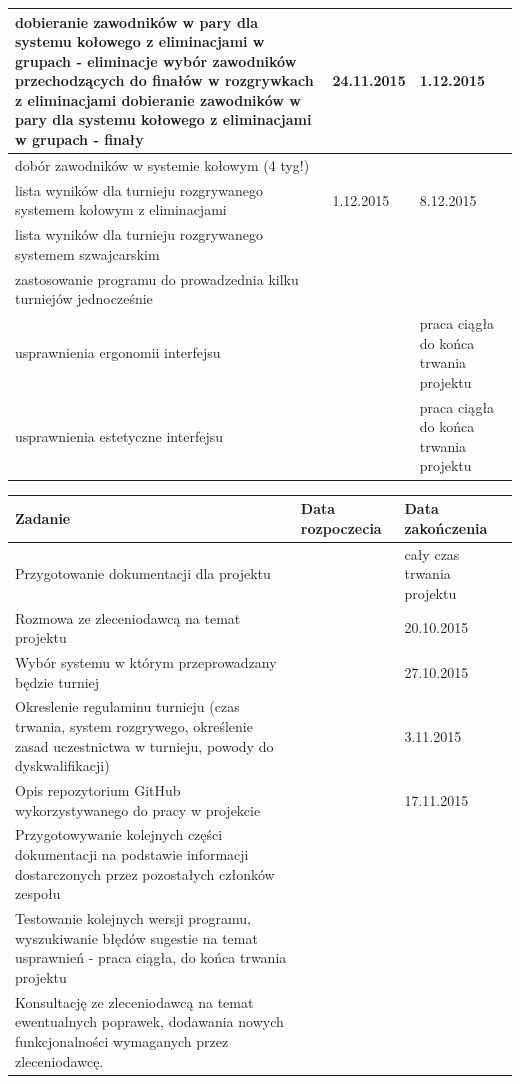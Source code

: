 \begin{tabular}{|p{9cm}|l|p{3cm}|}
dobieranie zawodników w pary dla systemu kołowego z eliminacjami w grupach - eliminacje
wybór zawodników przechodzących do finałów w rozgrywkach z eliminacjami
dobieranie zawodników w pary dla systemu kołowego z eliminacjami w grupach - finały&24.11.2015&1.12.2015\\ \hline
dobór zawodników w systemie kołowym (4 tyg!)&&\\ \hline 
lista wyników dla turnieju rozgrywanego systemem kołowym z eliminacjami&1.12.2015&8.12.2015\\ \hline
lista wyników dla turnieju rozgrywanego systemem szwajcarskim&&\\ \hline 
zastosowanie programu do prowadzednia kilku turniejów jednocześnie&&\\ \hline
usprawnienia ergonomii interfejsu&&praca ciągła do końca trwania projektu\\ \hline
usprawnienia estetyczne interfejsu&&praca ciągła do końca trwania projektu\\ \hline

\end{tabular}

\begin{tabular}{|p{9cm}|l|p{3cm}|} \hline
Zadanie & Data rozpoczecia & Data zakończenia\\ \hline
Przygotowanie dokumentacji dla projektu&&cały czas trwania projektu\\ \hline
Rozmowa ze zleceniodawcą na temat projektu &&20.10.2015\\ \hline
Wybór systemu w którym przeprowadzany będzie turniej &&27.10.2015\\ \hline
Okreslenie regulaminu turnieju (czas trwania,  system rozgrywego, określenie zasad uczestnictwa w turnieju, powody do dyskwalifikacji) &&3.11.2015\\ \hline
Opis repozytorium GitHub wykorzystywanego do pracy w projekcie &&17.11.2015\\ \hline
Przygotowywanie kolejnych części dokumentacji na podstawie informacji dostarczonych przez pozostałych członków zespołu&&\\ \hline
Testowanie kolejnych wersji  programu, wyszukiwanie błędów sugestie na temat usprawnień - praca ciągła, do końca trwania projektu&&\\ \hline
Konsultację ze zleceniodawcą na temat ewentualnych poprawek, dodawania nowych funkcjonalności wymaganych przez zleceniodawcę.&&\\ \hline 
\end{tabular}


